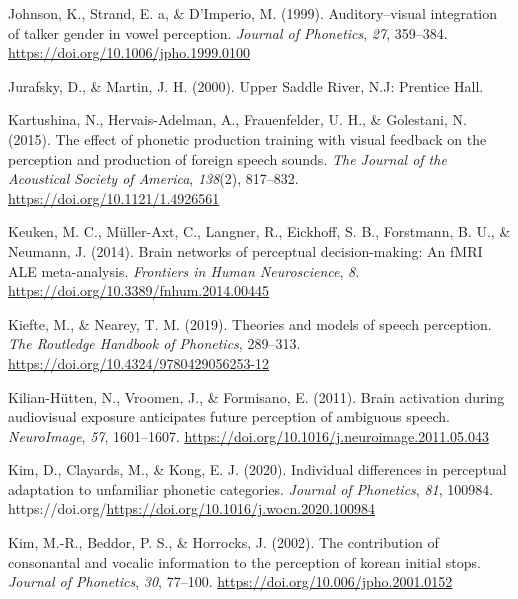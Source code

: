 \documentclass[
  11pt,
  man,floatsintext]{apa6}
\newlength{\cslhangindent}
\newlength{\cslentryspacingunit} %
\newenvironment{CSLReferences}[2] %
 {%
  \setlength{\parindent}{0pt}
  \ifodd #1
  \let\oldpar\par
  \def\par{\hangindent=\cslhangindent\oldpar}
  \fi
  \setlength{\parskip}{#2\cslentryspacingunit}
 }%
 {}
\begin{document}
\begin{CSLReferences}{1}{0}
\leavevmode{}%
Johnson, K., Strand, E. a, \& D'Imperio, M. (1999). Auditory--visual integration of talker gender in vowel perception. \emph{Journal of Phonetics}, \emph{27}, 359--384. \url{https://doi.org/10.1006/jpho.1999.0100}

\leavevmode{}%
Jurafsky, D., \& Martin, J. H. (2000). Upper Saddle River, N.J: Prentice Hall.

\leavevmode{}%
Kartushina, N., Hervais-Adelman, A., Frauenfelder, U. H., \& Golestani, N. (2015). The effect of phonetic production training with visual feedback on the perception and production of foreign speech sounds. \emph{The Journal of the Acoustical Society of America}, \emph{138}(2), 817--832. \url{https://doi.org/10.1121/1.4926561}

\leavevmode{}%
Keuken, M. C., Müller-Axt, C., Langner, R., Eickhoff, S. B., Forstmann, B. U., \& Neumann, J. (2014). Brain networks of perceptual decision-making: An fMRI ALE meta-analysis. \emph{Frontiers in Human Neuroscience}, \emph{8}. \url{https://doi.org/10.3389/fnhum.2014.00445}

\leavevmode{}%
Kiefte, M., \& Nearey, T. M. (2019). Theories and models of speech perception. \emph{The Routledge Handbook of Phonetics}, 289--313. \url{https://doi.org/10.4324/9780429056253-12}

\leavevmode{}%
Kilian-Hütten, N., Vroomen, J., \& Formisano, E. (2011). Brain activation during audiovisual exposure anticipates future perception of ambiguous speech. \emph{NeuroImage}, \emph{57}, 1601--1607. \url{https://doi.org/10.1016/j.neuroimage.2011.05.043}

\leavevmode{}%
Kim, D., Clayards, M., \& Kong, E. J. (2020). Individual differences in perceptual adaptation to unfamiliar phonetic categories. \emph{Journal of Phonetics}, \emph{81}, 100984. https://doi.org/\url{https://doi.org/10.1016/j.wocn.2020.100984}

\leavevmode{}%
Kim, M.-R., Beddor, P. S., \& Horrocks, J. (2002). The contribution of consonantal and vocalic information to the perception of korean initial stops. \emph{Journal of Phonetics}, \emph{30}, 77--100. \url{https://doi.org/10.006/jpho.2001.0152}


\end{CSLReferences}
\end{document}
